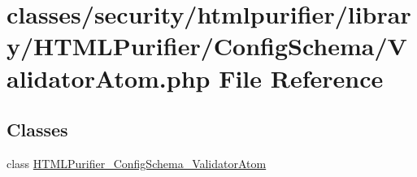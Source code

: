 \hypertarget{ValidatorAtom_8php}{\section{classes/security/htmlpurifier/library/\+H\+T\+M\+L\+Purifier/\+Config\+Schema/\+Validator\+Atom.php File Reference}
\label{ValidatorAtom_8php}
}
\subsection*{Classes}
\begin{DoxyCompactItemize}
\item 
class \hyperlink{classHTMLPurifier__ConfigSchema__ValidatorAtom}{H\+T\+M\+L\+Purifier\+\_\+\+Config\+Schema\+\_\+\+Validator\+Atom}
\end{DoxyCompactItemize}
